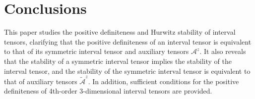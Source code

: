 \documentclass[twoside]{article}
\begin{document}
\section{Conclusions}
This paper studies the positive definiteness and Hurwitz stability of interval tensors, clarifying that the positive definiteness of an interval tensor is equivalent to that of its symmetric interval tensor and auxiliary tensors $\mathcal{A}^z$. It also reveals that the stability of a symmetric interval tensor implies the stability of the interval tensor, and the stability of the symmetric interval tensor is equivalent to that of auxiliary tensors $\tilde{\mathcal{A}}^z$. In addition, sufficient conditions for the positive definiteness of 4th-order 3-dimensional interval tensors are provided.

\end{document}
